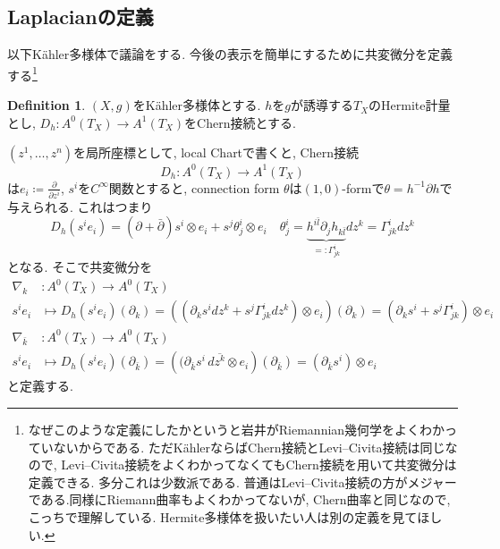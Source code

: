 \documentclass[dvipdfmx,a4paper,11pt]{article} %
\theoremstyle{definition}
\newtheorem{defn}[thm]{Definition}
\theoremstyle{remark}
\numberwithin{equation}{section}
\begin{document}
\subsection{Laplacianの定義}
以下K\"ahler多様体で議論をする. 今後の表示を簡単にするために共変微分を定義する\footnote{なぜこのような定義にしたかというと岩井がRiemannian幾何学をよくわかっていないからである. ただK\"ahlerならばChern接続とLevi--Civita接続は同じなので, Levi--Civita接続をよくわかってなくてもChern接続を用いて共変微分は定義できる. 多分これは少数派である. 普通はLevi--Civita接続の方がメジャーである.同様にRiemann曲率もよくわかってないが, Chern曲率と同じなので, こっちで理解している. Hermite多様体を扱いたい人は別の定義を見てほしい. }
\begin{defn}
$(X, g)$をK\"ahler多様体とする. 
$h$を$g$が誘導する$T_X$のHermite計量とし, 
$D_h \colon A^0(T_X) \to A^1(T_X)$をChern接続とする. 

$(z^1, \ldots, z^n)$を局所座標として, 
local Chartで書くと, Chern接続 
\[
D_h \colon A^0(T_X) \to A^{1}(T_X)
\]
は$e_i\coloneqq \frac{\partial}{\partial z^i}$, $s^i$を$C^\infty$関数とすると, connection form $\theta$は$(1,0)$-formで$\theta=h^{-1} \partial h$で与えられる. これはつまり
\[
D_h (s^i e_i) = (\partial + \bar\partial)s^i \otimes e_i + s^j \theta^{i}_{j} \otimes e_i
\quad
\theta^{i}_{j} = \underbrace{h^{i \bar{l}}\partial_j h_{k \bar{l}}}_{=:\Gamma_{jk}^{i} } dz^k =\Gamma_{jk}^{i} dz^k
\]
となる. 
そこで共変微分を
\begin{align*}
\nabla_{k} &\colon A^0(T_X) \to A^0(T_X) \\
s^i e_i &\mapsto D_h(s^i e_i)(\partial_k)
=\left((\partial_k s^i dz^k+s^j \Gamma_{jk}^{i} dz^k ) \otimes e_i\right)(\partial_k)
=(\partial_k s^i +s^j \Gamma_{jk}^{i} )\otimes e_i
\\
\nabla_{\bar k}& \colon A^0(T_X) \to A^0(T_X)
\\
s^i e_i &\mapsto D_h(s^i e_i)(\partial_{\bar k})
=\left((\partial_{\bar k} s^i\,d\overline{z^k} \otimes e_i\right)(\partial_{\bar k})
=(\partial_{\bar k} s^i )\otimes e_i
\end{align*}
と定義する. 
\end{defn}
\end{document}

